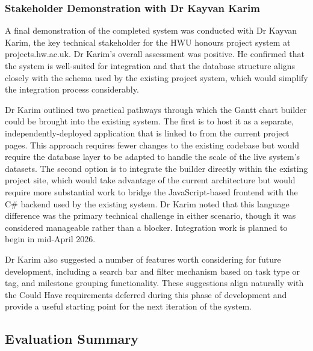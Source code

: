 \documentclass[12pt,nonacm,acmlarge,titlepage,screen]{acmart}
\begin{document}
\subsubsection{Stakeholder Demonstration with Dr Kayvan Karim}

A final demonstration of the completed system was conducted with Dr Kayvan Karim,
the key technical stakeholder for the HWU honours project system at
projects.hw.ac.uk. Dr Karim's overall assessment was positive. He confirmed that
the system is well-suited for integration and that the database structure aligns
closely with the schema used by the existing project system, which would simplify
the integration process considerably.

Dr Karim outlined two practical pathways through which the Gantt chart builder
could be brought into the existing system. The first is to host it as a separate,
independently-deployed application that is linked to from the current project pages.
This approach requires fewer changes to the existing codebase but would require the
database layer to be adapted to handle the scale of the live system's datasets. The
second option is to integrate the builder directly within the existing project site,
which would take advantage of the current architecture but would require more
substantial work to bridge the JavaScript-based frontend with the C\# backend used
by the existing system. Dr Karim noted that this language difference was the primary
technical challenge in either scenario, though it was considered manageable rather
than a blocker. Integration work is planned to begin in mid-April 2026.

Dr Karim also suggested a number of features worth considering for future
development, including a search bar and filter mechanism based on task type or tag,
and milestone grouping functionality. These suggestions align naturally with the
Could Have requirements deferred during this phase of development and provide a
useful starting point for the next iteration of the system.

\subsection{Evaluation Summary} \label{sec:eval_summary}
\end{document}
